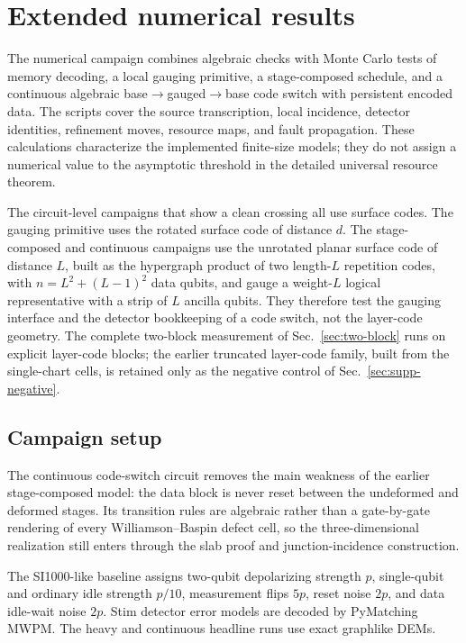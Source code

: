 \documentclass[aps,prx,reprint,superscriptaddress,nofootinbib,floatfix,longbibliography]{revtex4-2}
\theoremstyle{definition}
\begin{document}
\section{Extended numerical results}
\label{sec:supp-numerics}
The numerical campaign combines algebraic checks with Monte Carlo tests of memory decoding, a local gauging primitive, a stage-composed schedule, and a continuous algebraic base$\rightarrow$gauged$\rightarrow$base code switch with persistent encoded data.  The scripts cover the source transcription, local incidence, detector identities, refinement moves, resource maps, and fault propagation.  These calculations characterize the implemented finite-size models; they do not assign a numerical value to the asymptotic threshold in the detailed universal resource theorem.

The circuit-level campaigns that show a clean crossing all use surface codes.  The gauging primitive uses the rotated surface code of distance $d$.  The stage-composed and continuous campaigns use the unrotated planar surface code of distance $L$, built as the hypergraph product of two length-$L$ repetition codes, with $n=L^2+(L-1)^2$ data qubits, and gauge a weight-$L$ logical representative with a strip of $L$ ancilla qubits.  They therefore test the gauging interface and the detector bookkeeping of a code switch, not the layer-code geometry.  The complete two-block measurement of Sec.~\ref{sec:two-block} runs on explicit layer-code blocks; the earlier truncated layer-code family, built from the single-chart cells, is retained only as the negative control of Sec.~\ref{sec:supp-negative}.

\subsection{Campaign setup}
The continuous code-switch circuit removes the main weakness of the earlier stage-composed model: the data block is never reset between the undeformed and deformed stages.  Its transition rules are algebraic rather than a gate-by-gate rendering of every Williamson--Baspin defect cell, so the three-dimensional realization still enters through the slab proof and junction-incidence construction.

The SI1000-like baseline assigns two-qubit depolarizing strength $p$, single-qubit and ordinary idle strength $p/10$, measurement flips $5p$, reset noise $2p$, and data idle-wait noise $2p$.  Stim detector error models are decoded by PyMatching MWPM.  The heavy and continuous headline runs use exact graphlike DEMs.
\end{document}
